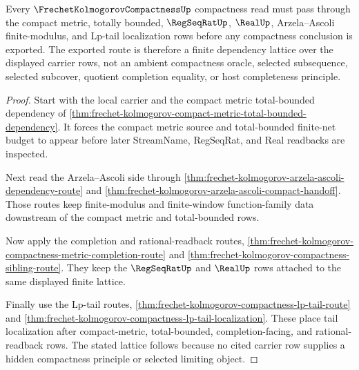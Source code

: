 \begin{theorem}
\label{thm:frechet-kolmogorov-compactness-upstream-lattice-repair}
Every $\FrechetKolmogorovCompactnessUp$ compactness read must pass through the compact metric, totally bounded, $\RegSeqRatUp$, $\RealUp$, Arzela--Ascoli finite-modulus, and Lp-tail localization rows before any compactness conclusion is exported. The exported route is therefore a finite dependency lattice over the displayed carrier rows, not an ambient compactness oracle, selected subsequence, selected subcover, quotient completion equality, or host completeness principle.
\end{theorem}
\begin{proof}
Start with the local carrier and the compact metric total-bounded dependency of \autoref{thm:frechet-kolmogorov-compact-metric-total-bounded-dependency}. It forces the compact metric source and total-bounded finite-net budget to appear before later StreamName, RegSeqRat, and Real readbacks are inspected.

Next read the Arzela--Ascoli side through \autoref{thm:frechet-kolmogorov-arzela-ascoli-dependency-route} and \autoref{thm:frechet-kolmogorov-arzela-ascoli-compact-handoff}. Those routes keep finite-modulus and finite-window function-family data downstream of the compact metric and total-bounded rows.

Now apply the completion and rational-readback routes, \autoref{thm:frechet-kolmogorov-compactness-metric-completion-route} and \autoref{thm:frechet-kolmogorov-compactness-sibling-route}. They keep the $\RegSeqRatUp$ and $\RealUp$ rows attached to the same displayed finite lattice.

Finally use the Lp-tail routes, \autoref{thm:frechet-kolmogorov-compactness-lp-tail-route} and \autoref{thm:frechet-kolmogorov-compactness-lp-tail-localization}. These place tail localization after compact-metric, total-bounded, completion-facing, and rational-readback rows. The stated lattice follows because no cited carrier row supplies a hidden compactness principle or selected limiting object.
\end{proof}
